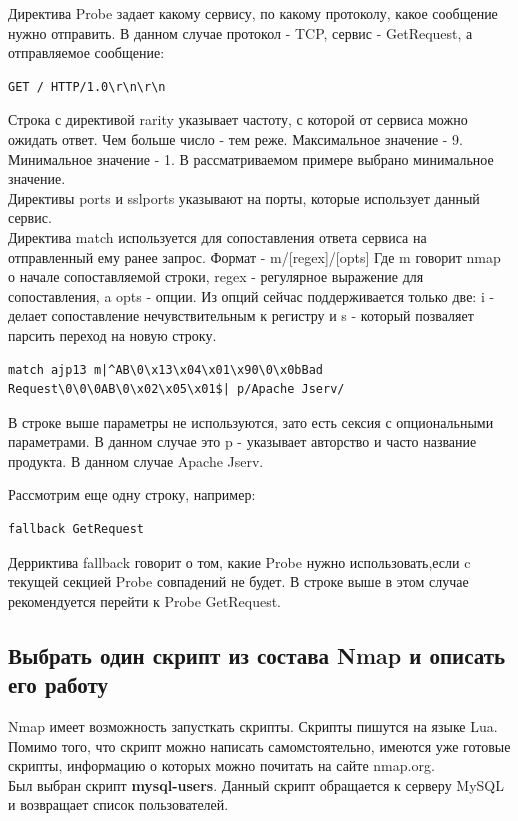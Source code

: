 \documentclass[10pt,a4paper,titlepage]{article}
\begin{document}
Директива Probe задает какому сервису, по какому протоколу, какое сообщение нужно отправить. В данном случае протокол - TCP, сервис - GetRequest, а отправляемое сообщение:

\begin{verbatim}
GET / HTTP/1.0\r\n\r\n
\end{verbatim}

Строка с директивой rarity указывает частоту, с которой от сервиса можно ожидать ответ. Чем больше число - тем реже. Максимальное значение - 9. Минимальное значение - 1. В рассматриваемом примере выбрано минимальное значение. \\

Директивы ports и sslports указывают на порты, которые использует данный сервис. \\

Директива match используется для сопоставления ответа сервиса на отправленный ему ранее запрос. Формат -  m/[regex]/[opts] Где m говорит nmap о начале сопоставляемой строки, regex - регулярное выражение для сопоставления, a opts - опции. Из опций сейчас поддерживается только две: i - делает сопоставление нечувствительным к регистру и s - который позваляет парсить переход на новую строку.

\begin{verbatim}
match ajp13 m|^AB\0\x13\x04\x01\x90\0\x0bBad Request\0\0\0AB\0\x02\x05\x01$| p/Apache Jserv/
\end{verbatim}

В строке выше параметры не используются, зато есть сексия с опциональными параметрами. В данном случае это p - указывает авторство и часто название продукта. В данном случае Apache Jserv.

Рассмотрим еще одну строку, например:

\begin{verbatim}
fallback GetRequest
\end{verbatim}

Дерриктива fallback говорит о том, какие Probe нужно использовать,если c текущей секцией Probe совпадений не будет. В строке выше в этом случае рекомендуется перейти к Probe GetRequest.

\subsection{Выбрать один скрипт из состава Nmap и описать его работу}
	Nmap имеет возможность запусткать скрипты. Скрипты пишутся на языке Lua. Помимо того, что скрипт можно написать самомстоятельно, имеются уже готовые скрипты, информацию о которых можно почитать на сайте nmap.org. \\
		Был выбран скрипт \textbf{mysql-users}. Данный скрипт обращается к серверу MySQL и возвращает список пользователей. 
\end{document}
